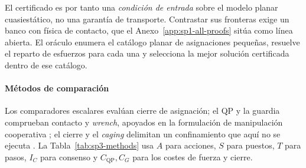 El certificado es por tanto una \emph{condición de entrada} sobre el modelo
planar cuasiestático, no una garantía de transporte. Contrastar sus fronteras
exige un banco con física de contacto, que el Anexo~\ref{app:sp1-all-proofs}
sitúa como línea abierta. El oráculo enumera el catálogo planar de asignaciones
pequeñas, resuelve el reparto de esfuerzos para cada una y selecciona la mejor
solución certificada dentro de ese catálogo.

\paragraph{Métodos de comparación}

Los comparadores escalares evalúan cierre de asignación; el QP y la guardia comprueban contacto y \emph{wrench}, apoyados en la formulación de manipulación cooperativa \parencite{nakamura1989dynamics,yoshikawa1993coordinated}; el cierre y el \emph{caging} delimitan un confinamiento que aquí no se ejecuta \parencite{bicchi1995closure,pereira2004caging}. La Tabla~\ref{tab:sp3-methods} usa $A$ para acciones, $S$ para puestos, $T$ para pasos, $I_C$ para consenso y $C_{\mathrm{QP}},C_G$ para los costes de fuerza y cierre.

